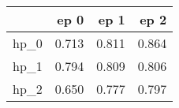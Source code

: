 \begin{tabular}{lrrr}
\toprule
{} &   ep 0 &   ep 1 &   ep 2 \\
\midrule
hp\_0 &  0.713 &  0.811 &  0.864 \\
hp\_1 &  0.794 &  0.809 &  0.806 \\
hp\_2 &  0.650 &  0.777 &  0.797 \\
\bottomrule
\end{tabular}
